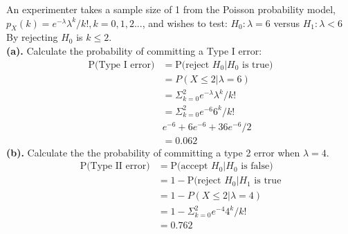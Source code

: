 \documentclass[12pt]{article}
\newenvironment{problem}[2][Problem]{\begin{trivlist}
\item[\hskip \labelsep {\bfseries #1}\hskip \labelsep {\bfseries #2.}]}{\end{trivlist}}
\begin{document}
\begin{problem}{6.4.18} An experimenter takes a sample size of 1 from the Poisson probability model, $p_X(k)=e^{-\lambda}\lambda^k/k!, k = 0,1,2...$, and wishes to test: 
	$H_0: \lambda = 6 $ versus
	$H_1: \lambda <6$
By rejecting $H_0$ is $k\leq 2$.\\
\textbf{(a).} Calculate the probability of committing a Type I error: 
\begin{align*}
	\text{P(Type I error)} &= \text{P(reject $H_0 | H_0$ is true)} \\
					&= P(X \leq 2 | \lambda = 6 ) \\ 
					&= \Sigma^2_{k=0}e^{-\lambda }\lambda^k/k! \\
					&= \Sigma^2_{k=0}e^{-6 }6^k/k! \\
					& e^{-6} + 6e^{-6} + 36e^{-6}/2 \\
					&= 0.062
\end{align*}
\textbf{(b).} Calculate the the probability of committing a type 2 error when $\lambda = 4$.
\begin{align*} 
	\text{P(Type II error)} &= \text{P(accept $H_0 | H_0 $ is false)} \\
		&= 1 - \text{P(reject $H_0 | H_1$ is true} \\
		&=  1 - P( X \leq 2 | \lambda = 4) \\
		&=  1- \Sigma^2_{k=0} e^{-4}4^k/k! \\
		&= 0.762
\end{align*}
\end{problem}
\end{document}
